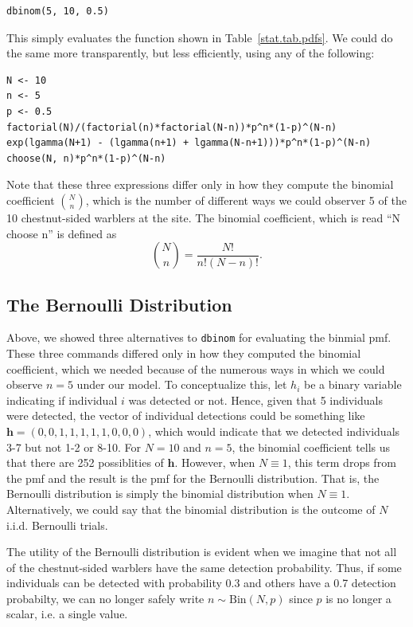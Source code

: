\begin{verbatim}
dbinom(5, 10, 0.5)
\end{verbatim}
This simply evaluates the function shown in
Table~\ref{stat.tab.pdfs}. We could do the same more transparently, but
less efficiently, using any of the following:
\begin{verbatim}
N <- 10
n <- 5
p <- 0.5
factorial(N)/(factorial(n)*factorial(N-n))*p^n*(1-p)^(N-n)
exp(lgamma(N+1) - (lgamma(n+1) + lgamma(N-n+1)))*p^n*(1-p)^(N-n)
choose(N, n)*p^n*(1-p)^(N-n)
\end{verbatim}

Note that these three expressions differ only in how they compute the
binomial coefficient $\binom{N}{n}$, which is the number of different ways
we could observer 5 of the 10 chestnut-sided warblers at the site. The
binomial coefficient, which is read ``N choose n'' is defined as
\begin{equation}
  \label{eq:1}
  \binom{N}{n} = \frac{N!}{n!(N-n)!}.
\end{equation}





\subsection{The Bernoulli Distribution}

Above, we showed three alternatives to \verb+dbinom+ for evaluating the
binmial pmf. These three commands differed only in how they computed
the binomial coefficient, which we needed because of the numerous ways
in which we could observe $n=5$ under our model. To conceptualize
this, let $h_i$ be a binary variable indicating if individual $i$
was detected or not. Hence, given that 5 individuals were detected,
the vector of individual detections could be something like
$\mathbf{h}=(0,0,1,1,1,1,1,0,0,0)$, which would indicate
that we detected individuals 3-7 but not 1-2 or 8-10. For $N=10$ and
$n=5$, the binomial coefficient tells us that there
are 252 possiblities of $\mathbf{h}$. However, when $N \equiv 1$, this term
drops from the pmf and the result is the pmf for the Bernoulli
distribution. That is, the Bernoulli distribution is simply the
binomial distribution when $N \equiv 1$. Alternatively, we could say that the binomial
distribution is the outcome of $N$ i.i.d. Bernoulli trials.

The utility of the Bernoulli distribution is evident when we imagine
that not all of the chestnut-sided warblers have the same detection
probability. Thus, if some individuals can be detected with
probability 0.3 and others have a 0.7 detection probabilty, we can no
longer safely write $n \sim \text{Bin}(N, p)$ since $p$ is no
longer a scalar, i.e. a single value.


